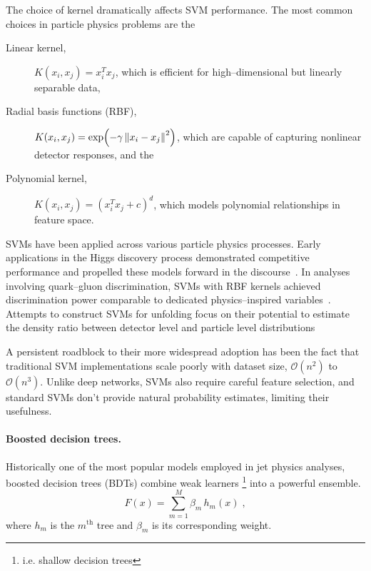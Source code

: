             The choice of kernel dramatically affects SVM performance.
            The most common choices in particle physics problems are the
            \begin{description}
                \item[Linear kernel,] \(K(x_i,x_j) = x_i^T x_j\), which is efficient for high--dimensional but linearly separable data,
                \item[Radial basis functions (RBF),] \(K(x_i,x_j) = \exp(-\gamma\,\norm{x_i-x_j}^2)\), which are capable of capturing nonlinear detector responses, and the
                \item[Polynomial kernel,] \(K(x_i,x_j) = (x_i^T x_j + c)^d\), which models polynomial relationships in feature space.
            \end{description}
            
            SVMs have been applied across various particle physics processes.
            Early applications in the Higgs discovery process demonstrated competitive performance and propelled these models forward in the discourse~\cite{bevan_support_2017}.
            In analyses involving quark--gluon discrimination, SVMs with RBF kernels achieved discrimination power comparable to dedicated physics--inspired variables~\cite{sforza_support_2013, Anguita2004ModelClassifier}.
            Attempts to construct SVMs for unfolding focus on their potential to estimate the density ratio between detector level and particle level distributions
            
            A persistent roadblock to their more widespread adoption has been the fact that traditional SVM implementations scale poorly with dataset size, \(\mathcal O(n^2)\) to \(\mathcal O(n^3)\).
            Unlike deep networks, SVMs also require careful feature selection, and standard SVMs don't provide natural probability estimates, limiting their usefulness.
    
        \paragraph{Boosted decision trees.}
            Historically one of the most popular models employed in jet physics analyses, boosted decision trees (BDTs) combine weak learners \footnote{i.e. shallow decision trees} into a powerful ensemble.
            \begin{equation}
                F(x) = \sum_{m=1}^M \beta_m \,h_m(x)\;,
            \end{equation}
            where \(h_m\) is the \(m^{\text{th}}\) tree and \(\beta_m\) is its corresponding weight.
            

